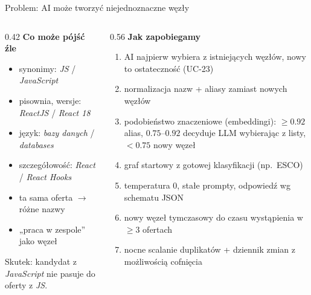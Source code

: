 \documentclass[aspectratio=169,10pt]{beamer}
\begin{document}
\begin{frame}{Problem: AI może tworzyć niejednoznaczne węzły}
  \small
  \begin{columns}[T]
    \begin{column}{0.42\textwidth}
      \textbf{Co może pójść źle}
      \begin{itemize}
        \item synonimy: \emph{JS} / \emph{JavaScript}
        \item pisownia, wersje: \emph{ReactJS} / \emph{React 18}
        \item język: \emph{bazy danych} / \emph{databases}
        \item szczegółowość: \emph{React} / \emph{React Hooks}
        \item ta sama oferta $\rightarrow$ różne nazwy
        \item „praca w zespole” jako węzeł
      \end{itemize}
      \medskip
      Skutek: kandydat z \emph{JavaScript} nie pasuje do oferty z \emph{JS}.
    \end{column}
    \begin{column}{0.56\textwidth}
      \textbf{Jak zapobiegamy}
      \begin{enumerate}
        \item AI \alert{najpierw wybiera z istniejących węzłów}, nowy to ostateczność (UC-23)
        \item normalizacja nazw + \alert{aliasy} zamiast nowych węzłów
        \item podobieństwo znaczeniowe (embeddingi): $\ge 0.92$ alias, $0.75$--$0.92$ decyduje LLM wybierając z listy, $< 0.75$ nowy węzeł
        \item graf startowy z gotowej klasyfikacji (np.\ ESCO)
        \item temperatura 0, stałe prompty, odpowiedź wg schematu JSON
        \item nowy węzeł \alert{tymczasowy} do czasu wystąpienia w $\ge 3$ ofertach
        \item nocne scalanie duplikatów + dziennik zmian z możliwością cofnięcia
      \end{enumerate}
    \end{column}
  \end{columns}
\end{frame}
\end{document}
